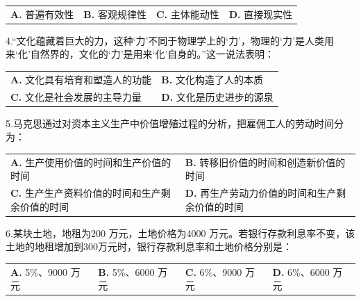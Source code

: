 \documentclass[UTF8,11pt]{ctexart}
\begin{document}
\begin{center}\begin{tabular}{>{\raggedright\arraybackslash}p{\dimexpr(\linewidth-8\tabcolsep)/4\relax}>{\raggedright\arraybackslash}p{\dimexpr(\linewidth-8\tabcolsep)/4\relax}>{\raggedright\arraybackslash}p{\dimexpr(\linewidth-8\tabcolsep)/4\relax}>{\raggedright\arraybackslash}p{\dimexpr(\linewidth-8\tabcolsep)/4\relax}}
\textbf{A.} 普遍有效性 & \textbf{B.} 客观规律性 & \textbf{C.} 主体能动性 & \textbf{D.} 直接现实性\\[.35em]\end{tabular}\end{center}

4.“文化蕴藏着巨大的力，这种‘力’不同于物理学上的‘力’，物理的‘力’是人类用来‘化’自然界的，文化的‘力’是用来‘化’自身的。”这一说法表明：


\begin{center}\begin{tabular}{>{\raggedright\arraybackslash}p{\dimexpr(\linewidth-4\tabcolsep)/2\relax}>{\raggedright\arraybackslash}p{\dimexpr(\linewidth-4\tabcolsep)/2\relax}}
\textbf{A.} 文化具有培育和塑造人的功能 & \textbf{B.} 文化构造了人的本质\\[.35em]
\textbf{C.} 文化是社会发展的主导力量 & \textbf{D.} 文化是历史进步的源泉\\[.35em]\end{tabular}\end{center}

5.马克思通过对资本主义生产中价值增殖过程的分析，把雇佣工人的劳动时间分为：


\begin{center}\begin{tabular}{>{\raggedright\arraybackslash}p{\dimexpr(\linewidth-4\tabcolsep)/2\relax}>{\raggedright\arraybackslash}p{\dimexpr(\linewidth-4\tabcolsep)/2\relax}}
\textbf{A.} 生产使用价值的时间和生产价值的时间 & \textbf{B.} 转移旧价值的时间和创造新价值的时间\\[.35em]
\textbf{C.} 生产生产资料价值的时间和生产剩余价值的时间 & \textbf{D.} 再生产劳动力价值的时间和生产剩余价值的时间\\[.35em]\end{tabular}\end{center}

6.某块土地，地租为200 万元，土地价格为4000 万元。若银行存款利息率不变，该土地的地租增加到300万元时，银行存款利息率和土地价格分别是：


\begin{center}\begin{tabular}{>{\raggedright\arraybackslash}p{\dimexpr(\linewidth-8\tabcolsep)/4\relax}>{\raggedright\arraybackslash}p{\dimexpr(\linewidth-8\tabcolsep)/4\relax}>{\raggedright\arraybackslash}p{\dimexpr(\linewidth-8\tabcolsep)/4\relax}>{\raggedright\arraybackslash}p{\dimexpr(\linewidth-8\tabcolsep)/4\relax}}
\textbf{A.} 5\%、9000 万元 & \textbf{B.} 5\%、6000 万元 & \textbf{C.} 6\%、9000 万元 & \textbf{D.} 6\%、6000 万元\\[.35em]\end{tabular}\end{center}
\end{document}
